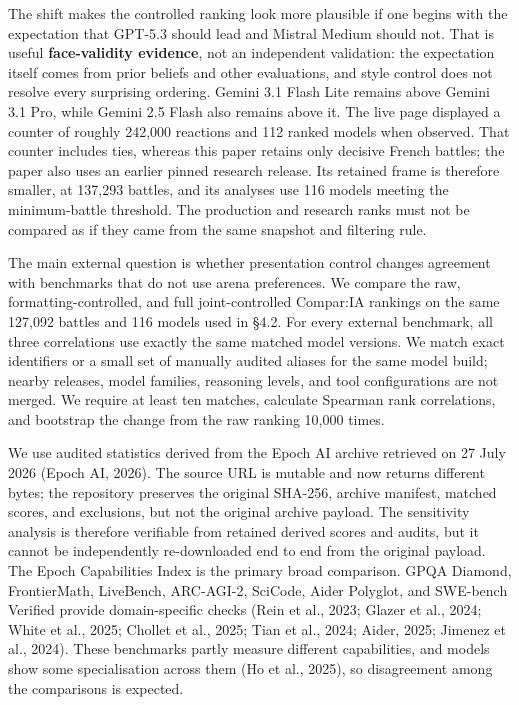\documentclass[
]{article}
\begin{document}
The shift makes the controlled ranking look more plausible if one begins
with the expectation that GPT-5.3 should lead and Mistral Medium should
not. That is useful \textbf{face-validity evidence}, not an independent
validation: the expectation itself comes from prior beliefs and other
evaluations, and style control does not resolve every surprising
ordering. Gemini 3.1 Flash Lite remains above Gemini 3.1 Pro, while
Gemini 2.5 Flash also remains above it. The live page displayed a
counter of roughly 242,000 reactions and 112 ranked models when
observed. That counter includes ties, whereas this paper retains only
decisive French battles; the paper also uses an earlier pinned research
release. Its retained frame is therefore smaller, at 137,293 battles,
and its analyses use 116 models meeting the minimum-battle threshold.
The production and research ranks must not be compared as if they came
from the same snapshot and filtering rule.

The main external question is whether presentation control changes
agreement with benchmarks that do not use arena preferences. We compare
the raw, formatting-controlled, and full joint-controlled Compar:IA
rankings on the same 127,092 battles and 116 models used in §4.2. For
every external benchmark, all three correlations use exactly the same
matched model versions. We match exact identifiers or a small set of
manually audited aliases for the same model build; nearby releases,
model families, reasoning levels, and tool configurations are not
merged. We require at least ten matches, calculate Spearman rank
correlations, and bootstrap the change from the raw ranking 10,000
times.

We use audited statistics derived from the Epoch AI archive retrieved on
27 July 2026 (Epoch AI, 2026). The source URL is mutable and now returns
different bytes; the repository preserves the original SHA-256, archive
manifest, matched scores, and exclusions, but not the original archive
payload. The sensitivity analysis is therefore verifiable from retained
derived scores and audits, but it cannot be independently re-downloaded
end to end from the original payload. The Epoch Capabilities Index is
the primary broad comparison. GPQA
Diamond, FrontierMath, LiveBench, ARC-AGI-2, SciCode, Aider Polyglot,
and SWE-bench Verified provide domain-specific checks (Rein et al.,
2023; Glazer et al., 2024; White et al., 2025; Chollet et al., 2025;
Tian et al., 2024; Aider, 2025; Jimenez et al., 2024). These benchmarks partly measure
different capabilities, and models show some specialisation across them
(Ho et al., 2025), so disagreement among the comparisons is expected.
\end{document}
